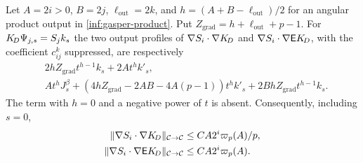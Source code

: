 \begin{lemma}
\label{inf:gradient-profiles}
Let $A=2i>0$, $B=2j$, $\ell_{\mathrm{out}}=2k$, and $h=(A+B-\ell_{\mathrm{out}})/2$ for an
angular product output in \eqref{inf:gasper-product}. Put
$Z_{\mathrm{grad}}=h+\ell_{\mathrm{out}}+p-1$.
For $K_{\!D}\Psi_{j,s}=S_jk_s$ the two output profiles
of $\nabla S_i\cdot\nabla K_{\!D}$ and
$\nabla S_i\cdot\nabla\mathsf EK_{\!D}$, with the coefficient
$c_{ij}^k$ suppressed, are respectively
\begin{align}
 &2hZ_{\mathrm{grad}}t^{h-1}k_s+2At^hk'_s,\label{inf:gradient-profile-one}\\
 &At^hJ_s^\beta+
 (4hZ_{\mathrm{grad}}-2AB-4A(p-1))t^hk'_s
                  +2BhZ_{\mathrm{grad}}t^{h-1}k_s.\label{inf:gradient-profile-two}
\end{align}
The term with $h=0$ and a negative power of $t$ is absent.
Consequently, including $s=0$,
\begin{align}
 \lVert \nabla S_i\cdot\nabla K_{\!D}\rVert_{\mathcal C\to\mathcal C}
 &\le CA2^i\varpi_p(A)/p,\label{inf:gradient-C-one}\\
 \lVert \nabla S_i\cdot\nabla\mathsf EK_{\!D}\rVert_{\mathcal C\to\mathcal C}
 &\le CA2^i\varpi_p(A).\label{inf:gradient-C-two}
\end{align}
\end{lemma}
